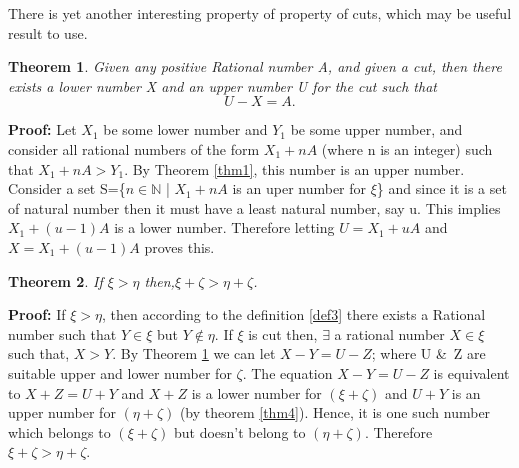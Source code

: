\documentclass[12pt,a4paper,final,titlepage]{article}
\newtheorem{thm}{Theorem}
\begin{document}
There is yet another interesting property of property of cuts, which may be useful result to use.

\begin{thm}\label{thm7}
Given any positive Rational number A, and given a cut, then there exists a lower number X and an upper number U for the cut such that
\begin{equation}
U-X = A. \nonumber
\end{equation}
\end{thm}
\textbf{Proof:} Let $X_1$ be some lower number and $Y_1$ be some upper number, and consider all rational numbers of the form $X_1+nA$ (where n is an integer) such that $X_1+nA > Y_1$. By Theorem \ref{thm1}, this number is an upper number. Consider a set S=\{$n\in\mathbb{N}$ | $X_1+nA$ is an uper number for $\xi$\} and since it is a set of natural number then it must have a least natural number, say u. This implies $X_1 + (u-1)A$ is a lower number. Therefore letting\: $U=X_1+uA$ and $X=X_1+(u-1)A$\: proves this.

\medskip

\begin{thm}\label{thm8}
If \quad $\xi > \eta$ \quad then,\quad $\xi+\zeta > \eta+\zeta$.
\end{thm}
\textbf{Proof:} If $\xi>\eta$, then according to the definition \ref{def3} there exists a Rational number such that $Y\in\xi$ but $Y\notin\eta$. If $\xi$ is cut then, $\exists$ a rational number $X\in\xi$ such that, $X>Y$. By Theorem \ref{thm7} we can let $X-Y=U-Z$; where U \&\ Z are suitable upper and lower number for $\zeta$. The equation $X-Y=U-Z$ is equivalent to $X+Z=U+Y$ and $X+Z$ is a lower number for $(\xi+\zeta)$ and $U+Y$ is an upper number for $(\eta+\zeta)$ (by theorem \ref{thm4}). Hence, it is one such number which belongs to $(\xi+\zeta)$ but doesn't belong to $(\eta+\zeta)$. Therefore $\xi+\zeta > \eta+\zeta$.

\bigskip
\bigskip
\bigskip
\end{document}
